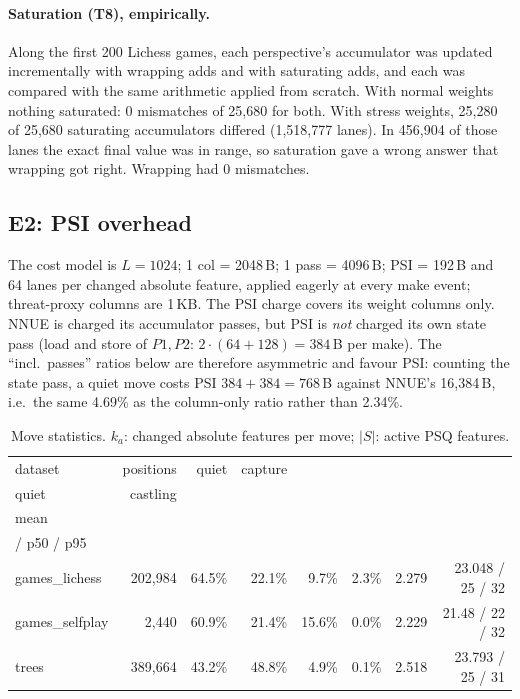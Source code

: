 \paragraph{Saturation (T8), empirically.}
Along the first 200 Lichess games, each perspective's accumulator was updated incrementally with wrapping adds and with saturating adds, and each was compared with the same arithmetic applied from scratch.
With normal weights nothing saturated: 0 mismatches of 25,680 for both.
With stress weights, 25,280 of 25,680 saturating accumulators differed (1,518,777 lanes).
In 456,904 of those lanes the exact final value was in range, so saturation gave a wrong answer that wrapping got right.
Wrapping had 0 mismatches.

\subsection{E2: PSI overhead}\label{sec:e2}

The cost model is $L=1024$; 1 col = 2048\,B; 1 pass = 4096\,B; PSI = 192\,B and 64 lanes per changed absolute feature, applied eagerly at every make event; threat-proxy columns are 1\,KB.
The PSI charge covers its weight columns only.
NNUE is charged its accumulator passes, but PSI is \emph{not} charged its own state pass (load and store of $P1,P2$: $2\cdot(64+128)=384$\,B per make).
The ``incl.\ passes'' ratios below are therefore asymmetric and favour PSI: counting the state pass, a quiet move costs PSI $384+384=768$\,B against NNUE's 16,384\,B, i.e.\ the same 4.69\% as the column-only ratio rather than 2.34\%.

\begin{table}[htbp]
\centering\small
\caption{Move statistics. $k_a$: changed absolute features per move; $|S|$: active PSQ features.}\label{tab:movestats}
\begin{tabular}{@{}lrrrrrrr@{}}
\toprule
dataset & positions & quiet & capture & \hd{king\\quiet} & castling & \hd{$k_a$\\mean} & \hd{$|S|$ mean\\/ p50 / p95}\\
\midrule
games\_lichess & 202,984 & 64.5\% & 22.1\% & 9.7\% & 2.3\% & 2.279 & 23.048 / 25 / 32\\
games\_selfplay & 2,440 & 60.9\% & 21.4\% & 15.6\% & 0.0\% & 2.229 & 21.48 / 22 / 32\\
trees & 389,664 & 43.2\% & 48.8\% & 4.9\% & 0.1\% & 2.518 & 23.793 / 25 / 31\\
\bottomrule
\end{tabular}
\end{table}

